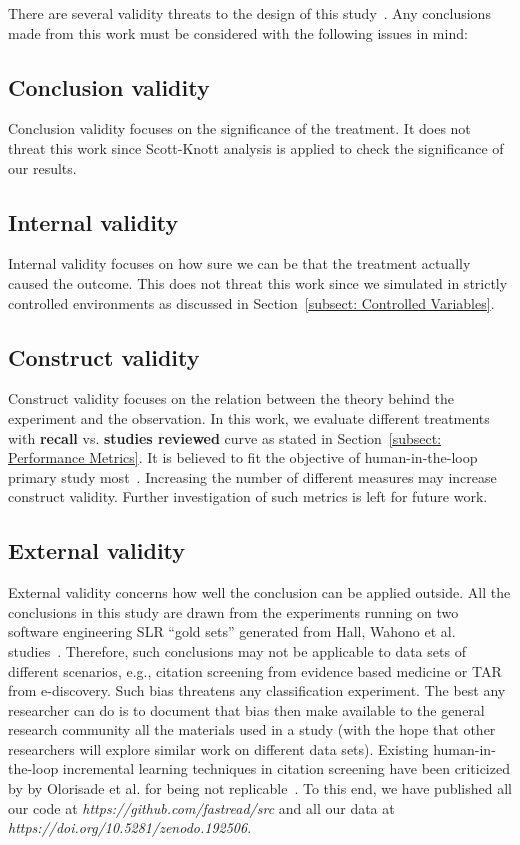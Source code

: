 \documentclass{svjour3}
\theoremstyle{break}
\begin{document}
There are several validity threats to the design of this study~\cite{feldt2010validity}. Any conclusions made from this work must be considered with the following issues in mind:

\subsection{Conclusion validity}

Conclusion validity focuses on the significance of the treatment. It does not threat this work since Scott-Knott analysis is applied to check the significance of our results.

\subsection{Internal validity}

Internal validity focuses on how sure we can be that the treatment
actually caused the outcome. This does not threat this work since we simulated in strictly controlled environments as discussed in Section~\ref{subsect: Controlled Variables}.

\subsection{Construct validity}

Construct validity focuses on the relation between the theory
behind the experiment and the observation. In this work, we evaluate different treatments with \textbf{recall} vs. \textbf{studies reviewed} curve as stated in Section~\ref{subsect: Performance Metrics}. It is believed to fit the objective of human-in-the-loop primary study most~\cite{tredennick2015,cormack2015autonomy,cormack2014evaluation}. Increasing the number of different measures may increase construct validity. Further investigation of such metrics is left for future work.

\subsection{External validity}

External validity concerns how well the conclusion can be applied outside. All the conclusions in this study are drawn from the experiments running on two software engineering SLR ``gold sets'' generated from Hall, Wahono et al. studies~\cite{hall2012systematic,wahono2015systematic}. Therefore, such conclusions may not be applicable to data sets of different scenarios, e.g., citation screening from evidence based medicine or TAR from e-discovery. Such bias threatens any classification experiment. The best any researcher can do is to document that bias then make available to the general research community all the materials used in a study (with the hope that other researchers will explore similar work on different data sets). Existing human-in-the-loop incremental learning techniques in citation screening have been criticized by by Olorisade et al. for being not replicable~\cite{olorisade2016critical}. To this end, we have published all our code at \textit{https://github.com/fastread/src} and all our data at \textit{https://doi.org/10.5281/zenodo.192506}.
\end{document}
